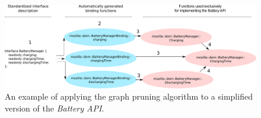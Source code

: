 \begin{figure}[ht]
  \centering
  \includegraphics[width=\textwidth]{figures/prune_graph.pdf}
  \caption{An example of applying the graph pruning algorithm to a simplified version of the \textit{Battery API}.}
  \label{fig:prune-graph}
\end{figure}
